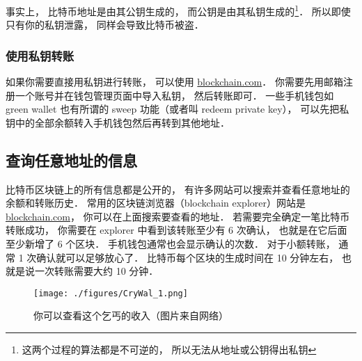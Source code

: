 事实上， 比特币地址是由其公钥生成的， 而公钥是由其私钥生成的\footnote{这两个过程的算法都是不可逆的， 所以无法从地址或公钥得出私钥}． 所以即使只有你的私钥泄露， 同样会导致比特币被盗．

\subsubsection{使用私钥转账}
如果你需要直接用私钥进行转账， 可以使用 \href{https://blockchain.com}{blockchain.com}． 你需要先用邮箱注册一个账号并在钱包管理页面中导入私钥， 然后转账即可． 一些手机钱包如 green wallet 也有所谓的 sweep 功能（或者叫 redeem private key）， 可以先把私钥中的全部余额转入手机钱包然后再转到其他地址．

\subsection{查询任意地址的信息}
比特币区块链上的所有信息都是公开的， 有许多网站可以搜索并查看任意地址的余额和转账历史． 常用的区块链浏览器（blockchain explorer）网站是 \href{https://blockchain.com}{blockchain.com}， 你可以在上面搜索要查看的地址． 若需要完全确定一笔比特币转账成功， 你需要在 explorer 中看到该转账至少有 6 次确认， 也就是在它后面至少新增了 6 个区块． 手机钱包通常也会显示确认的次数． 对于小额转账， 通常 1 次确认就可以足够放心了． 比特币每个区块的生成时间在 10 分钟左右， 也就是说一次转账需要大约 10 分钟．
\begin{figure}[ht]
\centering
\texttt{[image: ./figures/CryWal\_1.png]}
\caption{你可以查看这个乞丐的收入（图片来自网络）} \label{CryWal_fig1}
\end{figure}

